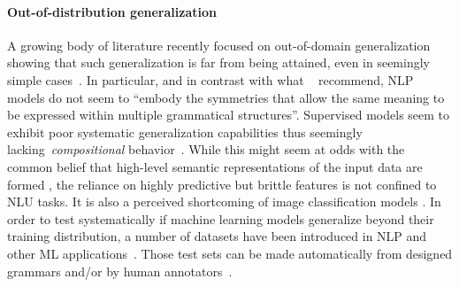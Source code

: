 \paragraph{Out-of-distribution generalization}
A growing body of literature recently focused on out-of-domain generalization showing that such generalization is far from being attained, even in seemingly simple cases~\citep{geirhos2018imagenet,jia2017adversarial,dasgupta2018evaluating}. In particular, and in contrast with what ~\citet{mitchell2018extrapolation} recommend, NLP models do not seem to ``embody the symmetries that allow the same meaning to be expressed within multiple grammatical structures''. Supervised models seem to exhibit poor systematic generalization capabilities \cite{loula2018rearranging,lake2017generalization,baan2019realization,hupkes2018learning} thus seemingly lacking~\emph{compositional} behavior~\citep{montague1970universal}. While this might seem at odds with the common belief that high-level semantic representations of the input data are formed \cite{bengio2009learning}, the reliance on highly predictive but brittle features is not confined to NLU tasks. It is also a perceived shortcoming of image classification models \cite{geirhos2018imagenet,jacobsen2018excessive,brendel2019approximating}.
In order to test systematically if machine learning models generalize beyond their training distribution, a number of datasets have been introduced in NLP and other ML applications~\cite{journals/cmig/Kalpathy-CramerHDABM15,peng2018moment,clark2019dont}.
Those test sets can be made automatically from designed grammars \cite{linzen2019right} and/or by human annotators~\cite{zhang-etal-2019-paws}. %


